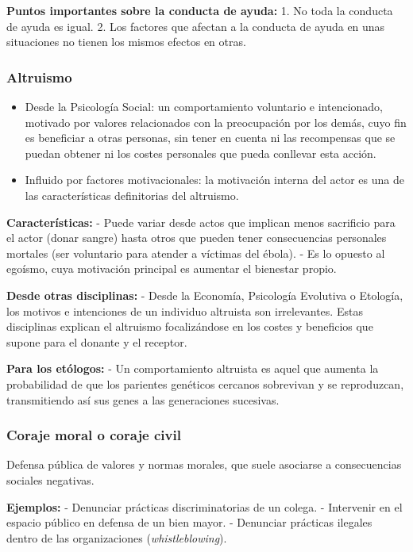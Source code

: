 \documentclass[
]{book}
\providecommand{\tightlist}{%
  \setlength{\itemsep}{0pt}\setlength{\parskip}{0pt}}
\begin{document}
\textbf{Puntos importantes sobre la conducta de ayuda:}
1. No toda la conducta de ayuda es igual.
2. Los factores que afectan a la conducta de ayuda en unas situaciones no tienen los mismos efectos en otras.

\subsubsection{Altruismo}\label{altruismo}

\begin{itemize}
\tightlist
\item
  Desde la Psicología Social: un comportamiento voluntario e intencionado, motivado por valores relacionados con la preocupación por los demás, cuyo fin es beneficiar a otras personas, sin tener en cuenta ni las recompensas que se puedan obtener ni los costes personales que pueda conllevar esta acción.
\item
  Influido por factores motivacionales: la motivación interna del actor es una de las características definitorias del altruismo.
\end{itemize}

\textbf{Características:}
- Puede variar desde actos que implican menos sacrificio para el actor (donar sangre) hasta otros que pueden tener consecuencias personales mortales (ser voluntario para atender a víctimas del ébola).
- Es lo opuesto al egoísmo, cuya motivación principal es aumentar el bienestar propio.

\textbf{Desde otras disciplinas:}
- Desde la Economía, Psicología Evolutiva o Etología, los motivos e intenciones de un individuo altruista son irrelevantes. Estas disciplinas explican el altruismo focalizándose en los costes y beneficios que supone para el donante y el receptor.

\textbf{Para los etólogos:}
- Un comportamiento altruista es aquel que aumenta la probabilidad de que los parientes genéticos cercanos sobrevivan y se reproduzcan, transmitiendo así sus genes a las generaciones sucesivas.

\subsubsection{Coraje moral o coraje civil}\label{coraje-moral-o-coraje-civil}

Defensa pública de valores y normas morales, que suele asociarse a consecuencias sociales negativas.

\textbf{Ejemplos:}
- Denunciar prácticas discriminatorias de un colega.
- Intervenir en el espacio público en defensa de un bien mayor.
- Denunciar prácticas ilegales dentro de las organizaciones (\emph{whistleblowing}).
\end{document}
